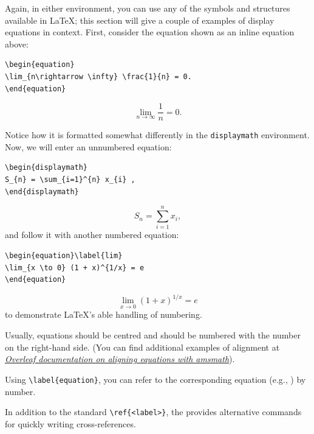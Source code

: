 \documentclass[a4paper]{jpconf}
\begin{document}
Again, in either environment, you can use any of the symbols and structures available in \LaTeX{}; this section will give a couple of examples of display equations in context. First, consider the equation shown as an inline equation above:
\begin{verbatim}
\begin{equation}
\lim_{n\rightarrow \infty} \frac{1}{n} = 0.
\end{equation}
\end{verbatim}
\begin{equation}
\lim_{n\rightarrow \infty} \frac{1}{n} = 0.
\end{equation}

Notice how it is formatted somewhat differently in
the \verb|displaymath| environment. Now, we will enter an unnumbered equation:
\begin{verbatim}
\begin{displaymath}
S_{n} = \sum_{i=1}^{n} x_{i} ,
\end{displaymath}
\end{verbatim}
\begin{displaymath}
S_{n} = \sum_{i=1}^{n} x_{i} ,
\end{displaymath}
and follow it with another numbered equation:
\begin{verbatim}
\begin{equation}\label{lim}
\lim_{x \to 0} (1 + x)^{1/x} = e
\end{equation}
\end{verbatim}
\begin{equation}\label{lim}
\lim_{x \to 0} (1 + x)^{1/x} = e
\end{equation}
to demonstrate \LaTeX's able handling of numbering.

Usually, equations should be centred and should be numbered with the number on the right-hand side. (You can find additional examples of alignment at \href{https://www.overleaf.com/learn/latex/Aligning_equations_with_amsmath}{\textit{Overleaf documentation on aligning equations with amsmath}}). 

Using \verb|\label{equation}|, you can refer to the corresponding equation (e.g., ) by number.

In addition to the standard \verb"\ref{<label>}", the  provides alternative commands for quickly writing cross-references.
\end{document}
